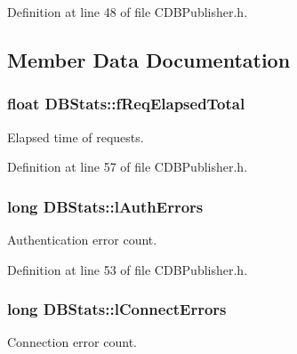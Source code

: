 \-Definition at line 48 of file \-C\-D\-B\-Publisher.\-h.



\subsection{\-Member \-Data \-Documentation}
\hypertarget{class_d_b_stats_a7715ab06ef60c47ffb5fa708a17e3d8e}{
\subsubsection[{f\-Req\-Elapsed\-Total}]{\setlength{\rightskip}{0pt plus 5cm}float {\bf \-D\-B\-Stats\-::f\-Req\-Elapsed\-Total}}}\label{class_d_b_stats_a7715ab06ef60c47ffb5fa708a17e3d8e}


\-Elapsed time of requests. 



\-Definition at line 57 of file \-C\-D\-B\-Publisher.\-h.

\hypertarget{class_d_b_stats_ae41b0a6c9128d35c08721cce020158f4}{
\subsubsection[{l\-Auth\-Errors}]{\setlength{\rightskip}{0pt plus 5cm}long {\bf \-D\-B\-Stats\-::l\-Auth\-Errors}}}\label{class_d_b_stats_ae41b0a6c9128d35c08721cce020158f4}


\-Authentication error count. 



\-Definition at line 53 of file \-C\-D\-B\-Publisher.\-h.

\hypertarget{class_d_b_stats_a5a5e64788999fb00f9530275e62c6bdb}{
\subsubsection[{l\-Connect\-Errors}]{\setlength{\rightskip}{0pt plus 5cm}long {\bf \-D\-B\-Stats\-::l\-Connect\-Errors}}}\label{class_d_b_stats_a5a5e64788999fb00f9530275e62c6bdb}


\-Connection error count. 



